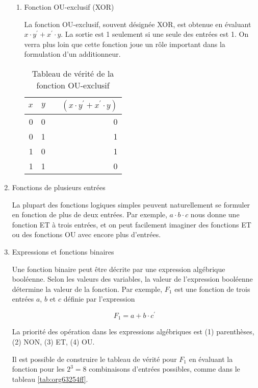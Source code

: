 \documentclass[letter, oneside]{book}
\begin{document}
\begin{enumerate}
\begin{enumerate}
\item Fonction OU-exclusif (XOR)
\label{sec:org8507097}

La fonction OU-exclusif, souvent désignée XOR, est obtenue en évaluant
\(x \cdot y^\prime + x^\prime \cdot y\). La sortie est 1 seulement si
une seule des entrées est 1. On verra plus loin que cette fonction
joue un rôle important dans la formulation d'un additionneur.

\begin{table}[htbp]
\caption{\label{tab:org95aa1d5}Tableau de vérité de la fonction OU-exclusif}
\centering
\begin{tabular}{rrlr}
\(x\) & \(y\) &  & \((x \cdot y^\prime + x^\prime \cdot y)\)\\[0pt]
\hline
0 & 0 &  & 0\\[0pt]
0 & 1 &  & 1\\[0pt]
1 & 0 &  & 1\\[0pt]
1 & 1 &  & 0\\[0pt]
\end{tabular}
\end{table}
\end{enumerate}

\item Fonctions de plusieurs entrées
\label{sec:orgfae2159}

La plupart des fonctions logiques simples peuvent naturellement se
formuler en fonction de plus de deux entrées. Par exemple, \(a \cdot b
\cdot c\) nous donne une fonction ET à trois entrées, et on peut
facilement imaginer des fonctions ET ou des fonctions OU avec encore
plus d'entrées.

\item Expressions et fonctions binaires
\label{sec:org540f501}

Une fonction binaire peut être décrite par une expression algébrique
booléenne. Selon les valeurs des variables, la valeur de l'expression
booléenne détermine la valeur de la fonction. Par exemple, \(F_1\) est
une fonction de trois entrées \(a\), \(b\) et \(c\) définie par
l'expression

$$F_1 = a + b \cdot c^\prime$$

La priorité des opération dans les expressions algébriques est (1)
parenthèses, (2) NON, (3) ET, (4) OU.

Il est possible de construire le tableau de vérité pour \(F_1\) en
évaluant la fonction pour les \(2^3 = 8\) combinaisons d'entrées
possibles, comme dans le tableau \ref{tab:org63254ff}.


\end{enumerate}
\end{document}
